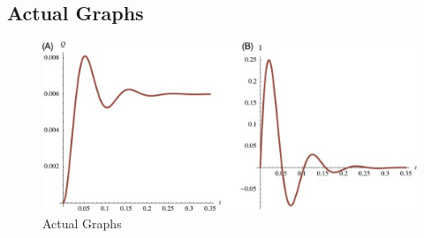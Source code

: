 \documentclass{article}
\begin{document}
\subsection*{Actual Graphs}

\begin{figure}[H]
    \centering
    \includegraphics[width = 13cm]{Expected.jpg}      
    \caption{Actual Graphs}
    \label{fig:Actual Graphs}
\end{figure}
\end{document}
